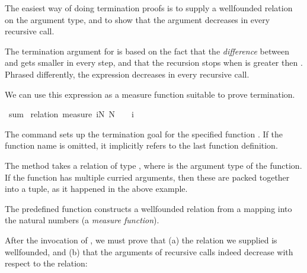 \begin{isabellebody}
\begin{isamarkuptext}
  The easiest way of doing termination proofs is to supply a wellfounded
  relation on the argument type, and to show that the argument
  decreases in every recursive call. 

  The termination argument for  is based on the fact that
  the \emph{difference} between  and  gets
  smaller in every step, and that the recursion stops when 
  is greater then . Phrased differently, the expression 
   decreases in every recursive call.

  We can use this expression as a measure function suitable to prove termination.%
\end{isamarkuptext}%
\isamarkuptrue%
\isamarkupfalse%
\ sum\isanewline
%
\isadelimproof
%
\endisadelimproof
%
\isatagproof
{}\isamarkupfalse%
\ {\isacharparenleft}relation\ {\isachardoublequoteopen}measure\ {\isacharparenleft}{\isasymlambda}{\isacharparenleft}i{\isacharcomma}N{\isacharparenright}{\isachardot}\ N\ {\isacharplus}\ {}\ {\isacharminus}\ i{\isacharparenright}{\isachardoublequoteclose}{\isacharparenright}%
\begin{isamarkuptxt}%
The  command sets up the termination goal for the
  specified function . If the function name is omitted, it
  implicitly refers to the last function definition.

  The  method takes a relation of
  type , where  is the argument type of
  the function. If the function has multiple curried arguments, then
  these are packed together into a tuple, as it happened in the above
  example.

  The predefined function  constructs a
  wellfounded relation from a mapping into the natural numbers (a
  \emph{measure function}). 

  After the invocation of , we must prove that (a)
  the relation we supplied is wellfounded, and (b) that the arguments
  of recursive calls indeed decrease with respect to the
  relation:


\end{isamarkuptxt}
\end{isabellebody}
